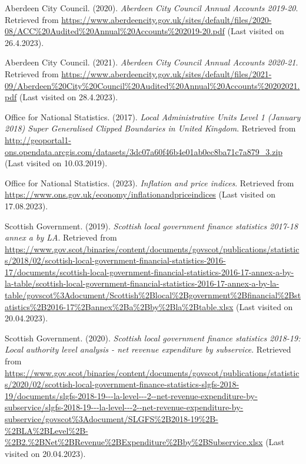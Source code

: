 \documentclass[
  12pt,
]{article}
\newlength{\cslhangindent}
\newlength{\cslentryspacingunit} %
\newenvironment{CSLReferences}[2] %
 {%
  \setlength{\parindent}{0pt}
  \ifodd #1
  \let\oldpar\par
  \def\par{\hangindent=\cslhangindent\oldpar}
  \fi
  \setlength{\parskip}{#2\cslentryspacingunit}
 }%
 {}
\begin{document}
\hypertarget{refs}{}
\begin{CSLReferences}{1}{0}
\leavevmode{}%
Aberdeen City Council. (2020). \emph{{Aberdeen City Council Annual Accounts 2019-20}}. Retrieved from \url{https://www.aberdeencity.gov.uk/sites/default/files/2020-08/ACC\%20Audited\%20Annual\%20Accounts\%202019-20.pdf} (Last visited on 26.4.2023).

\leavevmode{}%
Aberdeen City Council. (2021). \emph{{Aberdeen City Council Annual Accounts 2020-21}}. Retrieved from \url{https://www.aberdeencity.gov.uk/sites/default/files/2021-09/Aberdeen\%20City\%20Council\%20Audited\%20Annual\%20Accounts\%20202021.pdf} (Last visited on 28.4.2023).

\leavevmode{}%
Office for National Statistics. (2017). \emph{{Local Administrative Units Level 1 (January 2018) Super Generalised Clipped Boundaries in United Kingdom}}. Retrieved from \url{http://geoportal1-ons.opendata.arcgis.com/datasets/3dc07a60f46b4e01ab0ec8ba71c7a879_3.zip} (Last visited on 10.03.2019).

\leavevmode{}%
Office for National Statistics. (2023). \emph{{Inflation and price indices}}. Retrieved from \url{https://www.ons.gov.uk/economy/inflationandpriceindices} (Last visited on 17.08.2023).

\leavevmode{}%
Scottish Government. (2019). \emph{Scottish local government finance statistics 2017-18 annex a by LA}. Retrieved from \url{https://www.gov.scot/binaries/content/documents/govscot/publications/statistics/2018/02/scottish-local-government-financial-statistics-2016-17/documents/scottish-local-government-financial-statistics-2016-17-annex-a-by-la-table/scottish-local-government-financial-statistics-2016-17-annex-a-by-la-table/govscot\%3Adocument/Scottish\%2Blocal\%2Bgovernment\%2Bfinancial\%2Bstatistics\%2B2016-17\%2Bannex\%2Ba\%2Bby\%2Bla\%2Btable.xlsx} (Last visited on 20.04.2023).

\leavevmode{}%
Scottish Government. (2020). \emph{Scottish local government finance statistics 2018-19: Local authority level analysis - net revenue expenditure by subservice}. Retrieved from \url{https://www.gov.scot/binaries/content/documents/govscot/publications/statistics/2020/02/scottish-local-government-finance-statistics-slgfs-2018-19/documents/slgfs-2018-19---la-level---2--net-revenue-expenditure-by-subservice/slgfs-2018-19---la-level---2--net-revenue-expenditure-by-subservice/govscot\%3Adocument/SLGFS\%2B2018-19\%2B-\%2BLA\%2BLevel\%2B-\%2B2.\%2BNet\%2BRevenue\%2BExpenditure\%2Bby\%2BSubservice.xlsx} (Last visited on 20.04.2023).


\end{CSLReferences}
\end{document}
